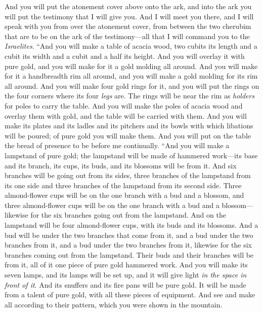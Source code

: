 \begin{biblechapter}
\verse And you will put the atonement cover above onto the ark, and into the ark you will put the testimony that I will give you.
\verse And I will meet you there, and I will speak with you from over the atonement cover, from between the two cherubim that are to be on the ark of the testimony—all that I will command you to the \textit{Israelites}.
 “And you will make a table of acacia wood, two cubits its length and a cubit its width and a cubit and a half its height.
\verse And you will overlay it with pure gold, and you will make for it a gold molding all around.
\verse And you will make for it a handbreadth rim all around, and you will make a gold molding for its rim all around.
\verse And you will make four gold rings for it, and you will put the rings on the four corners where its four \textit{legs} are.
\verse The rings will be near the rim as \textit{holders} for poles to carry the table.
\verse And you will make the poles of acacia wood and overlay them with gold, and the table will be carried with them.
\verse And you will make its plates and its ladles and its pitchers and its bowls with which libations will be poured; of pure gold you will make them.
\verse And you will put on the table the bread of presence to be before me continually.
\verse “And you will make a lampstand of pure gold; the lampstand will be made of hammered work—its base and its branch, its cups, its buds, and its blossoms will be from it.
\verse And six branches will be going out from its sides, three branches of the lampstand from its one side and three branches of the lampstand from its second side.
\verse Three almond-flower cups will be on the one branch with a bud and a blossom, and three almond-flower cups will be on the one branch with a bud and a blossom—likewise for the six branches going out from the lampstand.
\verse And on the lampstand will be four almond-flower cups, with its buds and its blossoms.
\verse And a bud will be under the two branches that come from it, and a bud under the two branches from it, and a bud under the two branches from it, likewise for the six branches coming out from the lampstand.
\verse Their buds and their branches will be from it, all of it one piece of pure gold hammered work.
\verse And you will make its seven lamps, and its lamps will be set up, and it will give light \textit{in the space in front of it}.
\verse And its snuffers and its fire pans will be pure gold.
\verse It will be made from a talent of pure gold, with all these pieces of equipment.
\verse And see and make all according to their pattern, which you were shown in the mountain.
\end{biblechapter}

